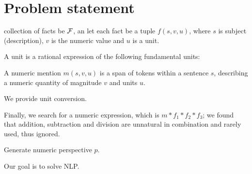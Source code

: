 \section{Problem statement}

collection of facts be $\mathcal{F}$, an let each fact be a tuple $f(s, v, u)$, where $s$ is subject (description), $v$ is the numeric value and $u$ is a unit.

A unit is a rational expression of the following fundamental units:

A numeric mention $m(s, v, u)$ is a span of tokens within a sentence $s$, describing a numeric quantity of magnitude $v$ and units $u$.

We provide unit conversion.

Finally, we search for a numeric expression, which is $m * f_1 * f_2 * f_3$; we found that addition, subtraction and division are unnatural in combination and rarely used, thus ignored.

Generate numeric perspective $p$.



Our goal is to solve NLP\@.
